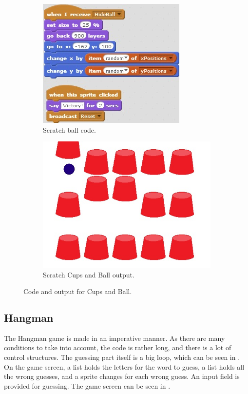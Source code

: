 \begin{figure}[h]
\begin{subfigure}[b]{0.45\textwidth}
\begin{center}
      \includegraphics[scale=0.7]{./pics/scratch_ball_code2}
      \caption{Scratch ball code.}
      \label{fig:scratch_ball_code2}
    \end{center}
    \end{subfigure}
    
    \begin{subfigure}[b]{\textwidth}
    \begin{center}
      \includegraphics[scale=0.5]{./pics/scratch_ball_out}
      \caption{Scratch Cups and Ball output.}
      \label{fig:scratch_ball_out}
    \end{center}
    \end{subfigure}
    \caption{Code and output for Cups and Ball.}
    \label{fig:scratch_ball}
\end{figure}

\subsection{Hangman}
The Hangman game is made in an imperative manner. As there are many conditions to take into account, the code is rather long, and there is a lot of control structures. The guessing part itself is a big loop, which can be seen in . On the game screen, a list holds the letters for the word to guess, a list holds all the wrong guesses, and a sprite changes for each wrong guess. An input field is provided for guessing. The game screen can be seen in .


